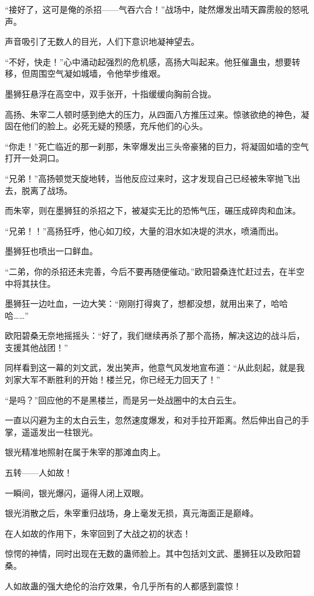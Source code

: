 \begin{this_body}
“接好了，这可是俺的杀招——气吞六合！”战场中，陡然爆发出晴天霹雳般的怒吼声。

声音吸引了无数人的目光，人们下意识地凝神望去。

“不好，快走！”心中涌动起强烈的危机感，高扬大叫起来。他狂催蛊虫，想要转移，但周围空气凝如城墙，令他举步维艰。

墨狮狂悬浮在高空中，双手张开，十指缓缓向胸前合拢。

高扬、朱宰二人顿时感到绝大的压力，从四面八方推压过来。惊骇欲绝的神色，凝固在他们的脸上。必死无疑的预感，充斥他们的心头。

“你走！”死亡临近的那一刹那，朱宰爆发出三头帝豪猪的巨力，将凝固如墙的空气打开一处洞口。

“兄弟！”高扬顿觉天旋地转，当他反应过来时，这才发现自己已经被朱宰抛飞出去，脱离了战场。

而朱宰，则在墨狮狂的杀招之下，被凝实无比的恐怖气压，碾压成碎肉和血沫。

“兄弟！！”高扬狂呼，他心如刀绞，大量的泪水如决堤的洪水，喷涌而出。

墨狮狂也喷出一口鲜血。

“二弟，你的杀招还未完善，今后不要再随便催动。”欧阳碧桑连忙赶过去，在半空中将其扶住。

墨狮狂一边吐血，一边大笑：“刚刚打得爽了，想都没想，就用出来了，哈哈哈……”

欧阳碧桑无奈地摇摇头：“好了，我们继续再杀了那个高扬，解决这边的战斗后，支援其他战团！”

同样看到这一幕的刘文武，发出笑声，他意气风发地宣布道：“从此刻起，就是我刘家大军不断胜利的开始！楼兰兄，你已经无力回天了！”

“是吗？”回应他的不是黑楼兰，而是另一处战圈中的太白云生。

一直以闪避为主的太白云生，忽然速度爆发，和对手拉开距离。然后伸出自己的手掌，遥遥发出一柱银光。

银光精准地照射在属于朱宰的那滩血肉上。

五转——人如故！

一瞬间，银光爆闪，逼得人闭上双眼。

银光消散之后，朱宰重归战场，身上毫发无损，真元海面正是巅峰。

在人如故的作用下，朱宰回到了大战之初的状态！

惊愕的神情，同时出现在无数的蛊师脸上。其中包括刘文武、墨狮狂以及欧阳碧桑。

人如故蛊的强大绝伦的治疗效果，令几乎所有的人都感到震惊！


\end{this_body}
